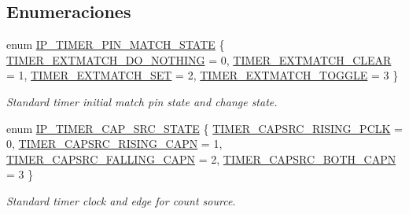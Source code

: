 \subsection*{Enumeraciones}
\begin{DoxyCompactItemize}
\item 
enum \hyperlink{group___t_i_m_e_r__18_x_x__43_x_x_ga29caa12f43ff996d3ebbf7d5f9036f2c}{I\+P\+\_\+\+T\+I\+M\+E\+R\+\_\+\+P\+I\+N\+\_\+\+M\+A\+T\+C\+H\+\_\+\+S\+T\+A\+TE} \{ \hyperlink{group___t_i_m_e_r__18_x_x__43_x_x_gga29caa12f43ff996d3ebbf7d5f9036f2caee61101edb52ea5ce70b74a41766467f}{T\+I\+M\+E\+R\+\_\+\+E\+X\+T\+M\+A\+T\+C\+H\+\_\+\+D\+O\+\_\+\+N\+O\+T\+H\+I\+NG} = 0, 
\hyperlink{group___t_i_m_e_r__18_x_x__43_x_x_gga29caa12f43ff996d3ebbf7d5f9036f2ca0fc4886f55eb7bcfda4baea4c08c551a}{T\+I\+M\+E\+R\+\_\+\+E\+X\+T\+M\+A\+T\+C\+H\+\_\+\+C\+L\+E\+AR} = 1, 
\hyperlink{group___t_i_m_e_r__18_x_x__43_x_x_gga29caa12f43ff996d3ebbf7d5f9036f2ca059e5dedfdab474ecafba9827116f5ff}{T\+I\+M\+E\+R\+\_\+\+E\+X\+T\+M\+A\+T\+C\+H\+\_\+\+S\+ET} = 2, 
\hyperlink{group___t_i_m_e_r__18_x_x__43_x_x_gga29caa12f43ff996d3ebbf7d5f9036f2caa7b4fdd349721213351a4bba29472215}{T\+I\+M\+E\+R\+\_\+\+E\+X\+T\+M\+A\+T\+C\+H\+\_\+\+T\+O\+G\+G\+LE} = 3
 \}\begin{DoxyCompactList}\small\item\em Standard timer initial match pin state and change state. \end{DoxyCompactList}
\item 
enum \hyperlink{group___t_i_m_e_r__18_x_x__43_x_x_ga1ceafbd6fb46418e292878934efb63aa}{I\+P\+\_\+\+T\+I\+M\+E\+R\+\_\+\+C\+A\+P\+\_\+\+S\+R\+C\+\_\+\+S\+T\+A\+TE} \{ \hyperlink{group___t_i_m_e_r__18_x_x__43_x_x_gga1ceafbd6fb46418e292878934efb63aaa9c110041557616b65aff5c20d03ae8be}{T\+I\+M\+E\+R\+\_\+\+C\+A\+P\+S\+R\+C\+\_\+\+R\+I\+S\+I\+N\+G\+\_\+\+P\+C\+LK} = 0, 
\hyperlink{group___t_i_m_e_r__18_x_x__43_x_x_gga1ceafbd6fb46418e292878934efb63aaae17c344c6e80cc8f2a0e6f5c4bc32269}{T\+I\+M\+E\+R\+\_\+\+C\+A\+P\+S\+R\+C\+\_\+\+R\+I\+S\+I\+N\+G\+\_\+\+C\+A\+PN} = 1, 
\hyperlink{group___t_i_m_e_r__18_x_x__43_x_x_gga1ceafbd6fb46418e292878934efb63aaaf07e78a49ce7829f3a7975196aeb5a5c}{T\+I\+M\+E\+R\+\_\+\+C\+A\+P\+S\+R\+C\+\_\+\+F\+A\+L\+L\+I\+N\+G\+\_\+\+C\+A\+PN} = 2, 
\hyperlink{group___t_i_m_e_r__18_x_x__43_x_x_gga1ceafbd6fb46418e292878934efb63aaaa09ba96751f9c750f9257050053ccb62}{T\+I\+M\+E\+R\+\_\+\+C\+A\+P\+S\+R\+C\+\_\+\+B\+O\+T\+H\+\_\+\+C\+A\+PN} = 3
 \}\begin{DoxyCompactList}\small\item\em Standard timer clock and edge for count source. \end{DoxyCompactList}
\end{DoxyCompactItemize}
